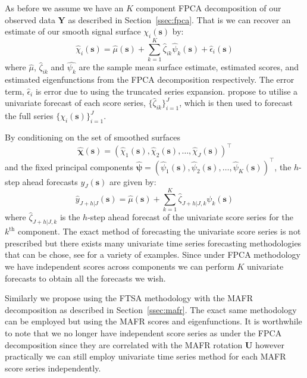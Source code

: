 \documentclass{article}
\newcommand{\ve}[1]{\bm{{#1}}}
\begin{document}
As before we assume we have an $K$ component FPCA decomposition of our observed data $\ve{Y}$ as described in Section~\ref{ssec:fpca}. That is we can recover an estimate of our smooth signal surface $\chi_i\left( \ve{s} \right)$ by:
\begin{equation}
  \hat{\chi}_i\left( \ve{s} \right) = \hat{\mu}\left( \ve{s} \right) + \sum_{k=1}^K \hat{\zeta}_{ik} \hat{\psi}_k\left( \ve{s} \right) + \hat{\epsilon}_i\left( \ve{s} \right)
  \label{eqn:recon}
\end{equation}
where $\hat{\mu}$, $\hat{\zeta}_{ik}$ and $\hat{\psi_k}$ are the sample mean surface estimate, estimated scores, and estimated eigenfunctions from the FPCA decomposition respectively. The error term, $\hat{\epsilon}_i$ is error due to using the truncated series expansion. \citet{shang_ftsa_2013} propose to utilise a univariate forecast of each score series, $\{\hat{\zeta}_{ik}\}_{i=1}^J$, which is then used to forecast the full series $\{\chi_i\left( \ve{s} \right)\}_{i=1}^J$.

By conditioning on the set of smoothed surfaces
\begin{equation*}
  \hat{\ve{\chi}}\left( \ve{s} \right) = \left( \hat{\chi}_1\left( \ve{s} \right), \hat{\chi}_2\left( \ve{s} \right), \dots, \hat{\chi}_J\left( \ve{s} \right) \right)^\top
\end{equation*}
and the fixed principal components $\hat{\ve{\psi}} = \left( \hat{\psi}_1\left( \ve{s} \right), \hat{\psi}_2\left( \ve{s} \right), \dots, \hat{\psi}_K\left( \ve{s} \right) \right)^\top$, the $h$-step ahead forecasts $y_J\left( \ve{s} \right)$ are given by:
\begin{equation}
  \hat{y}_{J+h | J}\left( \ve{s} \right) = \hat{\mu}\left( \ve{s} \right) + \sum_{k=1}^K \hat{\zeta}_{J+h | J, k} \psi_k\left( \ve{s} \right)
  \label{eqn:for}
\end{equation}
where $\hat{\zeta}_{J+h | J, k}$ is the $h$-step ahead forecast of the univariate score series for the $k^\text{th}$ component. The exact method of forecasting the univariate score series is not prescribed but there exists many univariate time series forecasting methodologies that can be chose, see \citet{hyndman_forecasting_2018} for a variety of examples. Since under FPCA methodology we have independent scores across components we can perform $K$ univariate forecasts to obtain all the forecasts we wish. 

Similarly we propose using the FTSA methodology with the MAFR decomposition as described in Section~\ref{ssec:mafr}. The exact same methodology can be employed but using the MAFR scores and eigenfunctions. It is worthwhile to note that we no longer have independent score series as under the FPCA decomposition since they are correlated with the MAFR rotation $\ve{U}$ however practically we can still employ univariate time series method for each MAFR score series independently.
\end{document}
